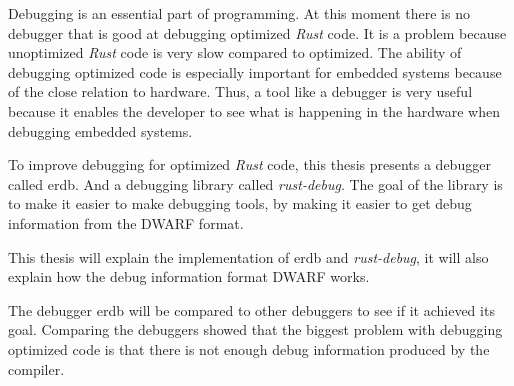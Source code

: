 Debugging is an essential part of programming.
At this moment there is no debugger that is good at debugging optimized \emph{Rust} code.
It is a problem because unoptimized \emph{Rust} code is very slow compared to optimized.
The ability of debugging optimized code is especially important for embedded systems because of the close relation to hardware.
Thus, a tool like a debugger is very useful because it enables the developer to see what is happening in the hardware when debugging embedded systems.


To improve debugging for optimized \emph{Rust} code, this thesis presents a debugger called \acrshort{erdb}.
And a debugging library called \emph{rust-debug}.
The goal of the library is to make it easier to make debugging tools, by making it easier to get debug information from the \acrshort{DWARF} format.


This thesis will explain the implementation of \acrshort{erdb} and \emph{rust-debug}, it will also explain how the debug information format \acrshort{DWARF} works.


The debugger \acrshort{erdb} will be compared to other debuggers to see if it achieved its goal.
Comparing the debuggers showed that the biggest problem with debugging optimized code is that there is not enough debug information produced by the compiler.

